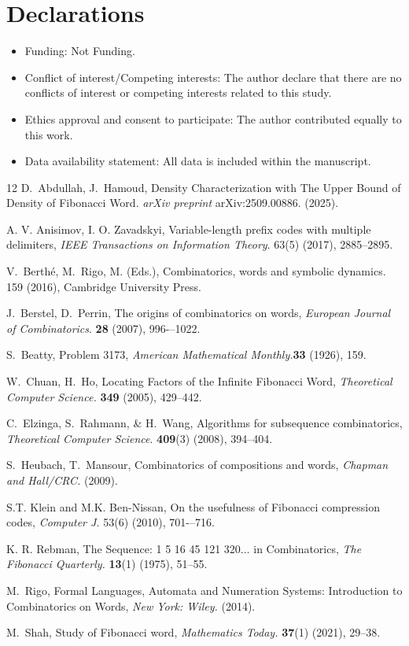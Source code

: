 \documentclass[12pt, a4paper]{article}
\begin{document}
\section*{Declarations}
\begin{itemize}
	\item Funding: Not Funding.
	\item Conflict of interest/Competing interests: The author declare that there are no conflicts of interest or competing interests related to this study.
	\item Ethics approval and consent to participate: The author contributed equally to this work.
	\item Data availability statement: All data is included within the manuscript.
\end{itemize}
\begin{thebibliography}{12}
 D.~Abdullah, J.~Hamoud, Density Characterization with The Upper Bound of Density of Fibonacci Word. {\em arXiv preprint} arXiv:2509.00886. (2025).

 A. V. Anisimov, I. O. Zavadskyi, Variable-length prefix codes with multiple delimiters, {\em IEEE Transactions on Information Theory}. 63(5) (2017), 2885--2895.

 V.~Berthé, M.~Rigo, M. (Eds.), Combinatorics, words and symbolic dynamics. 159 (2016), Cambridge University Press.

 J.~Berstel, D.~Perrin, The origins of combinatorics on words, {\em European Journal of Combinatorics}. \textbf{28} (2007), 996-–1022.

S.~Beatty, Problem 3173,  {\em American Mathematical Monthly.}\textbf{33} (1926), 159.

W.~Chuan, H.~Ho, 
 Locating Factors of the Infinite Fibonacci Word, {\em Theoretical Computer Science.} \textbf{349} (2005), 429--442.

 C.~Elzinga, S.~Rahmann, \& H.~Wang, Algorithms for subsequence combinatorics, {\em Theoretical Computer Science}. \textbf{409}(3) (2008), 394--404.

 S.~Heubach, T.~Mansour, Combinatorics of compositions and words, {\em Chapman and Hall/CRC.} (2009).


 S.T. Klein and M.K. Ben-Nissan, On the usefulness of Fibonacci compression codes, {\em Computer J.} 53(6) (2010), 701-–716.


 K. R. Rebman, The Sequence: 1 5 16 45 121 320$\dots$ in Combinatorics, {\em The Fibonacci Quarterly.} \textbf{13}(1) (1975), 51--55.

 M.~Rigo, Formal Languages, Automata and Numeration Systems: Introduction to Combinatorics on Words, {\em New York: Wiley.} (2014).


M.~Shah,  Study of Fibonacci word,  {\em Mathematics Today.} \textbf{37}(1) (2021), 29--38.





\end{thebibliography}
 
\end{document}
